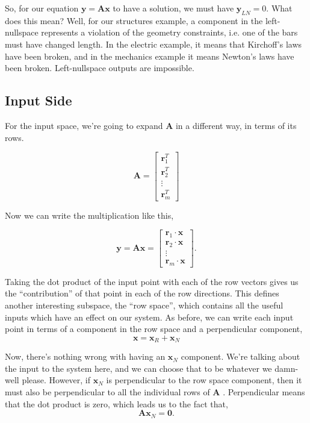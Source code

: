 \documentclass[a4paper,10pt]{article}
\newcommand{\mA}{$\mathbf{A}$ }
\begin{document}
So, for our equation $\mathbf{y} = \mathbf{A x}$ to have a solution, we must have $\mathbf{y}_{LN} = 0$. What does this mean? Well, for our structures example, a component in the left-nullspace represents a violation of the geometry constraints, i.e. one of the bars must have changed length. In the electric example, it means that Kirchoff's laws have been broken, and in the mechanics example it means Newton's laws have been broken. Left-nullspace outputs are impossible.


\subsection{Input Side}

For the input space, we're going to expand \mA in a different way, in terms of its rows.

\begin{equation}
 \mathbf{A} = \begin{bmatrix}\mathbf{r}_1^T \\ \mathbf{r}_2^T \\ \vdots \\ \mathbf{r}_m^T \end{bmatrix}
\end{equation}

Now we can write the multiplication like this,

\begin{equation}
 \mathbf{y} = \mathbf{A x} = \begin{bmatrix} \mathbf{r}_1 \cdot \mathbf{x} \\ \mathbf{r}_2 \cdot \mathbf{x} \\ \vdots \\ \mathbf{r}_m \cdot \mathbf{x} \end{bmatrix}    .
\end{equation}

Taking the dot product of the input point with each of the row vectors gives us the ``contribution'' of that point in each of the row directions. This defines another interesting subspace, the ``row space'', which contains all the useful inputs which have an effect on our system. As before, we can write each input point in terms of a component in the row space and a perpendicular component,
%
\begin{equation}
\mathbf{x} = \mathbf{x}_R + \mathbf{x}_{N}
\end{equation}

Now, there's nothing wrong with having an $\mathbf{x}_{N}$ component. We're talking about the input to the system here, and we can choose that to be whatever we damn-well please. However, if $\mathbf{x}_{N}$ is perpendicular to the row space component, then it must also be perpendicular to all the individual rows of \mA. Perpendicular means that the dot product is zero, which leads us to the fact that,
%
\begin{equation}
\mathbf{A x}_N = \mathbf{0}     .
\end{equation}
\end{document}
